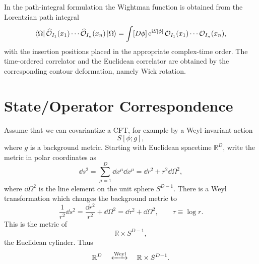 In the path-integral formulation the Wightman function is obtained from
the Lorentzian path integral
\[
  \bra{\Omega}
  \widehat{\mathcal O}_{I_1}(x_1)\cdots
  \widehat{\mathcal O}_{I_n}(x_n)
  \ket{\Omega}
  =
  \int [D\phi]\,\mathrm{e}^{\mathrm{i} S[\phi]}\,
  \mathcal O_{I_1}(x_1)\cdots \mathcal O_{I_n}(x_n),
\]
with the insertion positions placed in the appropriate complex-time
order.  The time-ordered correlator and the Euclidean correlator are
obtained by the corresponding contour deformation, namely Wick
rotation.

\section{State/Operator Correspondence}

Assume that we can covariantize a CFT, for example by a Weyl-invariant
action
\[
  S[\phi;g],
\]
where \(g\) is a background metric.  Starting with Euclidean spacetime
\(\mathbb R^D\), write the metric in polar coordinates as
\[
  \dd s^2=\sum_{\mu=1}^D \dd x^\mu \dd x^\mu
  =
  \dd r^2+r^2\dd\Omega^2,
\]
where \(\dd\Omega^2\) is the line element on the unit sphere
\(S^{D-1}\).  There is a Weyl transformation which changes the
background metric to
\[
  \frac1{r^2}\dd s^2
  =
  \frac{\dd r^2}{r^2}+\dd\Omega^2
  =
  \dd\tau^2+\dd\Omega^2,
  \qquad
  \tau\equiv \log r .
\]
This is the metric of
\[
  \mathbb R\times S^{D-1},
\]
the Euclidean cylinder.  Thus
\[
  \mathbb R^D
  \quad \xleftrightarrow{\text{Weyl}} \quad
  \mathbb R\times S^{D-1}.
\]


